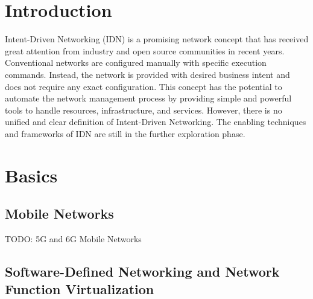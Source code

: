

\usepackage{xcolor} 
\usepackage{listings}





\tableofcontents

\clearpage
{}

\section{Introduction}
\label{sec:Introduction}
Intent-Driven Networking (IDN) is a promising network concept that has received great attention from industry and open source communities in recent years. Conventional networks are configured manually with specific execution commands. Instead, the network is provided with desired business intent and does not require any exact configuration. This concept has the potential to automate the network management process by providing simple and powerful tools to handle resources, infrastructure, and services\cite{Mwanje2021}. However, there is no unified and clear definition of Intent-Driven Networking. The enabling techniques and frameworks of IDN are still in the further exploration phase\cite{8968429}.

\section{Basics}
\label{sec:Basics}

\subsection{Mobile Networks}
TODO: 5G and 6G Mobile Networks


\subsection{Software-Defined Networking and Network Function Virtualization}

